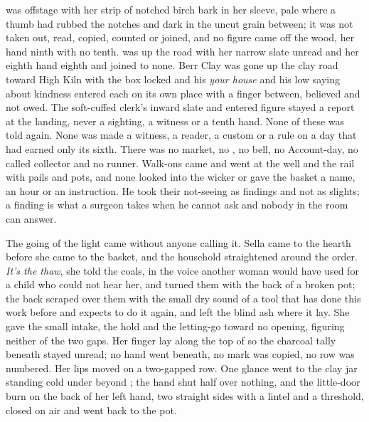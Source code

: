  was offstage with her strip of notched birch bark in her sleeve, pale where a thumb had rubbed the notches and dark in the uncut grain between; it was not taken out, read, copied, counted or joined, and no figure came off the wood, her hand ninth with no tenth.  was up the road with her narrow slate unread and her eighth hand eighth and joined to none. Berr Clay was gone up the clay road toward High Kiln with the box locked and his \emph{your house} and his low saying about kindness entered each on its own place with a finger between, believed and not owed. The soft-cuffed clerk's inward slate and entered figure stayed a report at the landing, never a sighting, a witness or a tenth hand. None of these was told again. None was made a witness, a reader, a custom or a rule on a day that had earned only its sixth. There was no market, no , no bell, no Account-day, no called collector and no runner. Walk-ons came and went at the well and the rail with pails and pots, and none looked into the wicker or gave the basket a name, an hour or an instruction. He took their not-seeing as findings and not as slights; a finding is what a surgeon takes when he cannot ask and nobody in the room can answer.

\scenebreak

The going of the light came without anyone calling it. Sella came to the hearth before she came to the basket, and the household straightened around the order. \emph{It's the thaw}, she told the coals, in the voice another woman would have used for a child who could not hear her, and turned them with the back of a broken pot; the back scraped over them with the small dry sound of a tool that has done this work before and expects to do it again, and left the blind ash where it lay. She gave the small intake, the hold and the letting-go toward no opening, figuring neither of the two gaps. Her finger lay along the top of  so the charcoal tally beneath stayed unread; no hand went beneath, no mark was copied, no row was numbered. Her lips moved on a two-gapped row. One glance went to the clay jar standing cold under  beyond ; the hand shut half over nothing, and the little-door burn on the back of her left hand, two straight sides with a lintel and a threshold, closed on air and went back to the pot.

